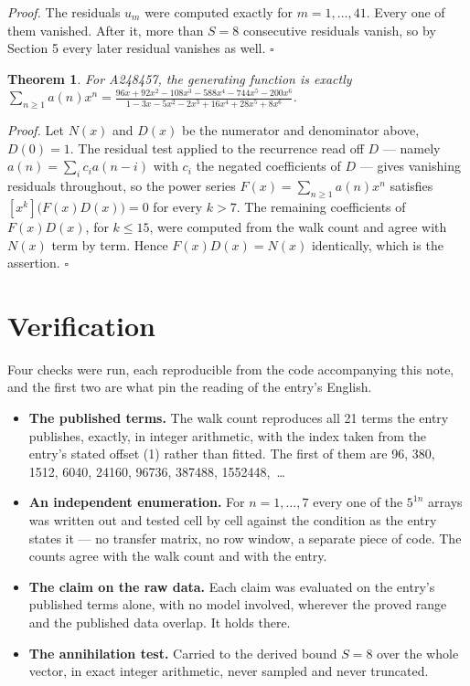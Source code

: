 \documentclass[11pt]{article}
\newtheorem{theorem}{Theorem}
\theoremstyle{definition}
\begin{document}
{\itshape Proof.} The residuals $u_m$ were computed exactly for $m = 1,\dots,41$. Every one of them vanished. After it, more than $S = 8$ consecutive residuals vanish, so by Section 5 every later residual vanishes as well. $\square$

\begin{theorem} For A248457, the generating function is exactly $\sum_{n\ge 1} a(n)x^n = \frac{96x + 92x^{2} - 108x^{3} - 588x^{4} - 744x^{5} - 200x^{6}}{1 - 3x - 5x^{2} - 2x^{3} + 16x^{4} + 28x^{5} + 8x^{6}}$.\end{theorem}

{\itshape Proof.} Let $N(x)$ and $D(x)$ be the numerator and denominator above, $D(0)=1$. The residual test applied to the recurrence read off $D$ --- namely $a(n) = \sum_i c_i a(n-i)$ with $c_i$ the negated coefficients of $D$ --- gives vanishing residuals throughout, so the power series $F(x)=\sum_{n\ge 1}a(n)x^n$ satisfies $[x^k]\bigl(F(x)D(x)\bigr) = 0$ for every $k > 7$. The remaining coefficients of $F(x)D(x)$, for $k \le 15$, were computed from the walk count and agree with $N(x)$ term by term. Hence $F(x)D(x) = N(x)$ identically, which is the assertion. $\square$

\section{Verification}

Four checks were run, each reproducible from the code accompanying this note, and the first two are what pin the reading of the entry's English.

\begin{itemize}

\item {\bfseries The published terms.} The walk count reproduces all 21 terms the entry publishes, exactly, in integer arithmetic, with the index taken from the entry's stated offset (1) rather than fitted. The first of them are 96, 380, 1512, 6040, 24160, 96736, 387488, 1552448,~\dots

\item {\bfseries An independent enumeration.} For $n = 1,\dots,7$ every one of the $5^{1n}$ arrays was written out and tested cell by cell against the condition as the entry states it --- no transfer matrix, no row window, a separate piece of code. The counts agree with the walk count and with the entry.

\item {\bfseries The claim on the raw data.} Each claim was evaluated on the entry's published terms alone, with no model involved, wherever the proved range and the published data overlap. It holds there.

\item {\bfseries The annihilation test.} Carried to the derived bound $S = 8$ over the whole vector, in exact integer arithmetic, never sampled and never truncated.

\end{itemize}
\end{document}
